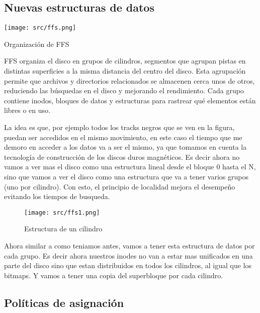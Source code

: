 \documentclass[openany]{book}
\begin{document}
\subsection{Nuevas estructuras de datos}

\begin{floatingfigure}[r]{0.4\textwidth}
    \texttt{[image: src/ffs.png]}
    \caption{Organización de FFS}
\end{floatingfigure}

FFS organiza el disco en grupos de cilindros, segmentos que agrupan pistas en distintas superficies a la misma distancia del centro del disco. Esta agrupación permite que archivos y directorios relacionados se almacenen cerca unos de otros, reduciendo las búsquedas en el disco y mejorando el rendimiento. Cada grupo contiene inodos, bloques de datos y estructuras para rastrear qué elementos están libres o en uso.

La idea es que, por ejemplo todos los tracks negros que se ven en la figura, puedan ser accedidos en el mismo movimiento, en este caso el tiempo que me demoro en acceder a los datos va a ser el mismo, ya que tomamos en cuenta la tecnología de construcción de los discos duros magnéticos.  Es decir ahora no vamos a ver mas el disco como una estructura lineal desde el bloque 0 hasta el N, sino que vamos a ver el disco como una estructura que va a tener \colorbox{blue!20}{varios grupos} (uno por cilindro). Con esto, el principio de \colorbox{blue!20}{localidad} mejora el desempeño \colorbox{blue!20}{evitando los tiempos de busqueda}.

\newpage

\begin{figure}[h]
    \centering
    \texttt{[image: src/ffs1.png]}
    \caption{Estructura de un cilindro}
\end{figure}

Ahora similar a como teniamos antes, vamos a tener esta estructura de datos \colorbox{blue!20}{por cada grupo}. Es decir ahora nuestros \colorbox{blue!20}{inodes} no van a estar mas unificados en una parte del disco sino que estan \colorbox{blue!20}{distribuidos} en todos los cilindros, al igual que los \colorbox{blue!20}{bitmaps}. Y vamos a tener una \colorbox{blue!20}{copia del superbloque} por cada cilindro.

\subsection{Políticas de asignación}
\end{document}
